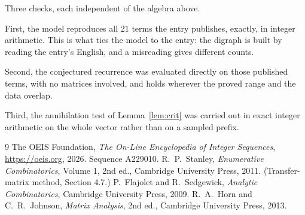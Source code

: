 \documentclass[11pt,a4paper]{article}
\theoremstyle{plain}
\theoremstyle{definition}
\begin{document}
Three checks, each independent of the algebra above.

First, the model reproduces all $21$ terms the entry publishes, exactly, in integer
arithmetic. This is what ties the model to the entry: the digraph is built by reading the
entry's English, and a misreading gives different counts.

Second, the conjectured recurrence was evaluated directly on those published terms, with no
matrices involved, and holds wherever the proved range and the data overlap.

Third, the annihilation test of Lemma~\ref{lem:crit} was carried out in exact integer
arithmetic on the whole vector rather than on a sampled prefix.

\begin{thebibliography}{9}
 The OEIS Foundation, \emph{The On-Line Encyclopedia of Integer
Sequences}, \url{https://oeis.org}, 2026. Sequence A229010.
 R.~P.~Stanley, \emph{Enumerative Combinatorics}, Volume 1, 2nd ed.,
Cambridge University Press, 2011. (Transfer-matrix method, Section 4.7.)
 P.~Flajolet and R.~Sedgewick, \emph{Analytic Combinatorics}, Cambridge
University Press, 2009.
 R.~A.~Horn and C.~R.~Johnson, \emph{Matrix Analysis}, 2nd ed., Cambridge
University Press, 2013.
\end{thebibliography}
\end{document}
